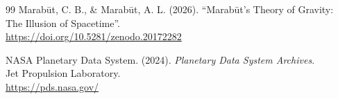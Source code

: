 \documentclass[11pt, a4paper]{article}
\begin{document}
\begin{thebibliography}{99}
  Marab\={u}t, C. B., \& Marab\={u}t, A. L. (2026). ``Marab\={u}t's Theory of Gravity: \\
  The Illusion of Spacetime''. \\
  \url{https://doi.org/10.5281/zenodo.20172282}

   NASA Planetary Data System. (2024). \textit{Planetary Data System Archives}. \\
  Jet Propulsion Laboratory. \\
  \url{https://pds.nasa.gov/}
\end{thebibliography}
\end{document}

